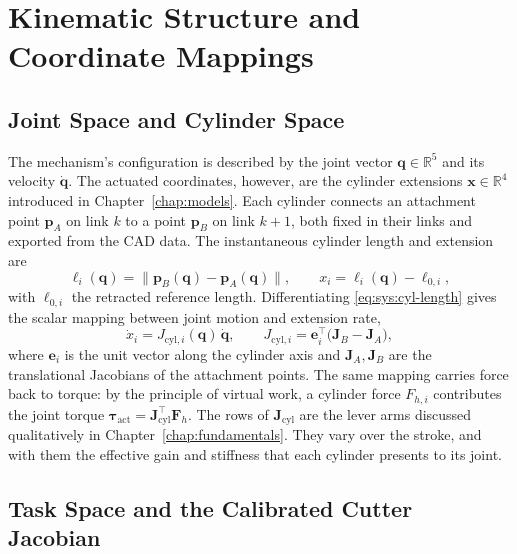 \section{Kinematic Structure and Coordinate Mappings}
\label{sec:sys:kinematics}

\subsection{Joint Space and Cylinder Space}

The mechanism's configuration is described by the joint vector
$\bm{q} \in \mathbb{R}^5$ and its velocity $\dot{\bm{q}}$. The actuated
coordinates, however, are the cylinder extensions
$\bm{x} \in \mathbb{R}^4$ introduced in Chapter~\ref{chap:models}. Each
cylinder connects an attachment point $\bm{p}_A$ on link $k$ to a point
$\bm{p}_B$ on link $k{+}1$, both fixed in their links and exported from
the CAD data. The instantaneous cylinder length and extension are
%
\begin{equation}
  \label{eq:sys:cyl-length}
  \ell_i(\bm{q}) = \bigl\| \bm{p}_B(\bm{q}) - \bm{p}_A(\bm{q}) \bigr\|,
  \qquad
  x_i = \ell_i(\bm{q}) - \ell_{0,i},
\end{equation}
%
with $\ell_{0,i}$ the retracted reference length. Differentiating
\eqref{eq:sys:cyl-length} gives the scalar mapping between joint motion
and extension rate,
%
\begin{equation}
  \label{eq:sys:cyl-jac}
  \dot{x}_i = J_{\mathrm{cyl},i}(\bm{q})\, \dot{\bm{q}},
  \qquad
  J_{\mathrm{cyl},i} = \bm{e}_i^{\!\top}
  \bigl( \bm{J}_B - \bm{J}_A \bigr),
\end{equation}
%
where $\bm{e}_i$ is the unit vector along the cylinder axis and
$\bm{J}_A, \bm{J}_B$ are the translational Jacobians of the attachment
points. The same mapping carries force back to torque: by the principle
of virtual work, a cylinder force $F_{h,i}$ contributes the joint
torque $\bm{\tau}_{\mathrm{act}} = \bm{J}_{\mathrm{cyl}}^{\top}
\bm{F}_h$. The rows of $\bm{J}_{\mathrm{cyl}}$ are the lever arms
discussed qualitatively in Chapter~\ref{chap:fundamentals}. They vary
over the stroke, and with them the effective gain and stiffness that
each cylinder presents to its joint.

\subsection{Task Space and the Calibrated Cutter Jacobian}
\label{sec:sys:task-jacobian}

